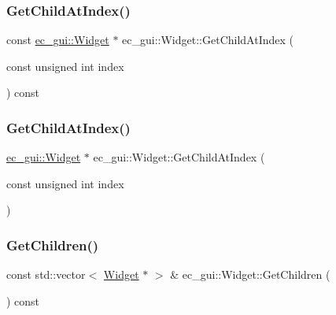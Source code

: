 \subsubsection{\texorpdfstring{Get\+Child\+At\+Index()}{GetChildAtIndex()}\hspace{0.1cm}{\footnotesize\ttfamily [1/2]}}
{\footnotesize\ttfamily const \mbox{\hyperlink{classec__gui_1_1_widget}{ec\+\_\+gui\+::\+Widget}} $\ast$ ec\+\_\+gui\+::\+Widget\+::\+Get\+Child\+At\+Index (\begin{DoxyParamCaption}\item[{const unsigned int}]{index }\end{DoxyParamCaption}) const\hspace{0.3cm}{\ttfamily [virtual]}}

\mbox{\label{classec__gui_1_1_widget_acf322b4d06d7700ed53fe1e58b77ef1c}} 
\subsubsection{\texorpdfstring{Get\+Child\+At\+Index()}{GetChildAtIndex()}\hspace{0.1cm}{\footnotesize\ttfamily [2/2]}}
{\footnotesize\ttfamily \mbox{\hyperlink{classec__gui_1_1_widget}{ec\+\_\+gui\+::\+Widget}} $\ast$ ec\+\_\+gui\+::\+Widget\+::\+Get\+Child\+At\+Index (\begin{DoxyParamCaption}\item[{const unsigned int}]{index }\end{DoxyParamCaption})\hspace{0.3cm}{\ttfamily [virtual]}}

\mbox{\label{classec__gui_1_1_widget_ab26607bf3de0ceae841e41945ab8f9e4}} 
\subsubsection{\texorpdfstring{Get\+Children()}{GetChildren()}}
{\footnotesize\ttfamily const std\+::vector$<$ \mbox{\hyperlink{classec__gui_1_1_widget}{Widget}} $\ast$ $>$ \& ec\+\_\+gui\+::\+Widget\+::\+Get\+Children (\begin{DoxyParamCaption}{ }\end{DoxyParamCaption}) const\hspace{0.3cm}{\ttfamily [virtual]}}

